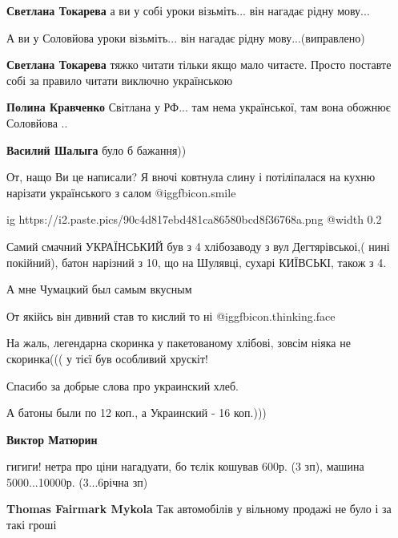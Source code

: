\begin{itemize}
\begin{itemize} %
\textbf{Светлана Токарева} а ви у собі уроки візьміть... він нагадає рідну мову...

А ви у Соловйова уроки візьміть... він нагадає рідну мову...(виправлено)

\textbf{Светлана Токарева} тяжко читати тільки якщо мало читаєте. Просто поставте собі за правило читати виключно українською

\textbf{Полина Кравченко} Світлана у РФ... там нема української, там вона обожнює Соловйова ..

\textbf{Василий Шалыга} було б бажання))
\end{itemize} %


От, нащо Ви це написали? Я вночі ковтнула слину і потіліпалася на кухню
нарізати українського з салом  @igg{fbicon.smile} 


\ifcmt
  ig https://i2.paste.pics/90c4d817ebd481ca86580bcd8f36768a.png
  @width 0.2
\fi


Самий смачний УКРАЇНСЬКИЙ був з 4 хлібозаводу з вул Дегтярівськоі,( нині
покійний), батон нарізний з 10, що на Шулявці, сухарі КИЇВСЬКІ, також з 4.


А мне Чумацкий был самым вкусным

От якійсь він дивний став то кислий то ні @igg{fbicon.thinking.face} 

На жаль, легендарна скоринка у пакетованому хлібові, зовсім ніяка не
скоринка((( у тієї був особливий хрускіт!

Спасибо за добрые слова про украинский хлеб.

А батоны были по 12 коп., а Украинский - 16 коп.)))

\begin{itemize} %
\textbf{Виктор Матюрин} 

гигиги! нетра про ціни нагадуати, бо тєлік кошував 600р. (3 зп), машина
5000...10000р. (3...6річна зп)

\textbf{Thomas Fairmark Mykola} Так автомобілів у вільному продажі не було і за такі гроші
\end{itemize} %


\end{itemize}
